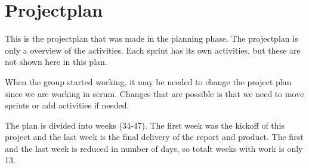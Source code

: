 \section{Projectplan}

	This is the projectplan that was made in the planning phase. The projectplan
	is only a overview of the activities. Each sprint has its own activities, but
	these are not shown here in this plan. 

	When the group started working, it may be needed to change the project plan since we
	are working in scrum. Changes that are possible is that we need to move sprints or
	add activities if needed. 

	The plan is divided into weeks (34-47). The first week was the kickoff of this project
	and the last week is the final delivery of the report and product.
	The first and the last week is reduced in number of days, so totalt weeks with work is
	only 13. \\

